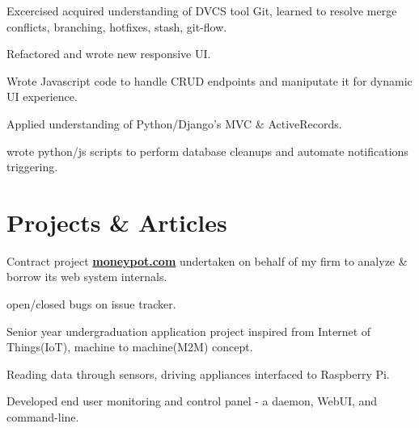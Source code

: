 \documentclass[]{deedy-resume-openfont}
\begin{document}
\begin{minipage}[t]{0.66\textwidth}
\vspace{\topsep} %
\begin{tightemize}
\item  Excercised acquired understanding of DVCS tool Git, learned to resolve
  merge conflicts, branching, hotfixes, stash, git-flow.
\item Refactored and wrote new responsive UI.
\item Wrote Javascript code to handle CRUD endpoints and maniputate it for dynamic UI experience.
\item Applied understanding of Python/Django's MVC \& ActiveRecords.
\item wrote python/js scripts to perform database cleanups and automate notifications triggering.
\end{tightemize}
\sectionsep




\section{Projects \& Articles}
\begin{tightemize}
\item Contract project \href{http://swlogs.me/blog/the-moneypot-project/}{\textbf{moneypot.com}} undertaken on
  behalf of my firm to analyze \& borrow its web system internals.
\item open/closed bugs on issue tracker.

\end{tightemize}
\sectionsep

\descript{}
\begin{tightemize}
\item Senior year undergraduation application project inspired from Internet of Things(IoT),
  machine to machine(M2M) concept.
\item Reading data through sensors, driving appliances interfaced to Raspberry Pi.
\item Developed end user monitoring and control panel - a daemon, WebUI, and command-line.
\end{tightemize}
\sectionsep


\end{minipage}
\end{document}
